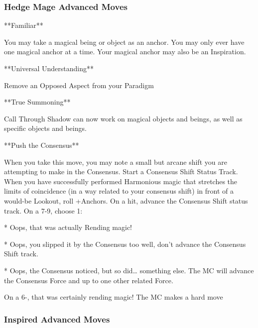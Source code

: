 \documentclass[
  oneside,
  statementpaper,
  9pt]{memoir}
\begin{document}
\hypertarget{hedge-mage-advanced-moves}{%
\subsubsection{Hedge Mage Advanced
Moves}\label{hedge-mage-advanced-moves}}

\begin{Player}

**Familiar**

You may take a magical being or object as an anchor. You may only ever have one magical anchor at a time. Your magical anchor may also be an Inspiration.

**Universal Understanding**

Remove an Opposed Aspect from your Paradigm

**True Summoning**

Call Through Shadow can now work on magical objects and beings, as well as specific objects and beings.

**Push the Consensus**

When you take this move, you may note a small but arcane shift you are attempting to make in the Consensus. Start a Consensus Shift Status Track. When you have successfully performed Harmonious magic that stretches the limits of coincidence (in a way related to your consensus shift) in front of a would-be Lookout, roll +Anchors. On a hit, advance the Consensus Shift status track. On a 7-9, choose 1:

* Oops, that was actually Rending magic!

* Oops, you slipped it by the Consensus too well, don’t advance the Consensus Shift track.

* Oops, the Consensus noticed, but so did… something else. The MC will advance the Consensus Force and up to one other related Force.

On a 6-, that was certainly rending magic! The MC makes a hard move

\end{Player}

\hypertarget{inspired-advanced-moves}{%
\subsubsection{Inspired Advanced Moves}\label{inspired-advanced-moves}}
\end{document}
